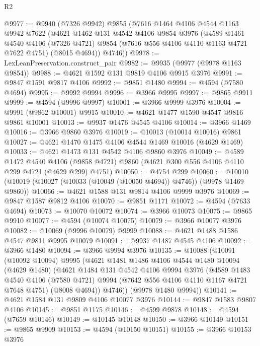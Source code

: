 \begin{lexlean}{R2}
\begin{coremodule}
@9977 := @9940
    (@7326 @9942)
    @9855
    (@7616
      @1464
      @4106
      @4544
      @1163
      @9942
      @7622
      (@4621
        @1462
        @131
        @4542
        @4106
        @9854
        @3976
        (@4589
          @1461
          @4540
          @4106
          (@7326 @4721)
          @9854
          (@7616 @556 @4106 @4110 @1163 @4721 @7622 @4751)
          (@8015 @4694))
        @4746))
@9978 := LexLeanPreservation.construct_pair
@9982 := @9935 (@9977 (@9978 @1163 @9854))
@9988 := @4621 @1592 @131 @9819 @4106 @9915 @3976
@9991 := @9847 @1591 @9817 @4106
@9992 := @9851 @1480
@9994 := @4594 (@7580 @4694)
@9995 := @9992 @9994
@9996 := @3966 @9995
@9997 := @9865 @9911
@9999 := @4594 (@9996 @9997)
@10001 := @3966 @9999 @3976
@10004 := @9991 (@9862 @10001) @9915
@10010 := @4621 @1477 @1590 @4547 @9816 @9861 @10001
@10013 := @9937 @1476 @4545 @4106
@10014 := @3966 @1469
@10016 := @3966 @9860 @3976
@10019 := @10013 (@10014 @10016) @9861
@10027 := @4621 @1470 @1475 @4106 @4544 @1469 @10016 (@4629 @1469)
@10033 := @4621 @1473 @131 @4542 @4106 @9860 @3976
@10049 := @4589
    @1472
    @4540
    @4106
    (@9858 @4721)
    @9860
    (@4621 @300 @556 @4106 @4110 @299 @4721 (@4629 @299) @4751)
@10050 := @4754 @299
@10060 := @10010 (@10019 (@10027 (@10033 (@10049 (@10050 @4694)) @4746)) (@9978 @1469 @9860))
@10066 := @4621 @1588 @131 @9814 @4106 @9999 @3976
@10069 := @9847 @1587 @9812 @4106
@10070 := @9851 @1171
@10072 := @4594 (@7633 @4694)
@10073 := @10070 @10072
@10074 := @3966 @10073
@10075 := @9865 @9910
@10077 := @4594 (@10074 @10075)
@10079 := @3966 @10077 @3976
@10082 := @10069 (@9996 @10079) @9999
@10088 := @4621 @1488 @1586 @4547 @9811 @9995 @10079
@10091 := @9937 @1487 @4545 @4106
@10092 := @3966 @1480
@10094 := @3966 @9994 @3976
@10135 := @10088
    (@10091
      (@10092 @10094)
      @9995
      (@4621
        @1481
        @1486
        @4106
        @4544
        @1480
        @10094
        (@4629 @1480)
        (@4621
          @1484
          @131
          @4542
          @4106
          @9994
          @3976
          (@4589
            @1483
            @4540
            @4106
            (@7580 @4721)
            @9994
            (@7642 @556 @4106 @4110 @1167 @4721 @7648 @4751)
            (@8008 @4694))
          @4746))
      (@9978 @1480 @9994))
@10141 := @4621 @1584 @131 @9809 @4106 @10077 @3976
@10144 := @9847 @1583 @9807 @4106
@10145 := @9851 @1175
@10146 := @4599 @9878
@10148 := @4594 (@7659 @10146)
@10149 := @10145 @10148
@10150 := @3966 @10149
@10151 := @9865 @9909
@10153 := @4594 (@10150 @10151)
@10155 := @3966 @10153 @3976

\end{coremodule}
\end{lexlean}
